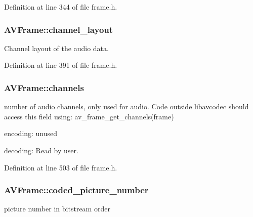 Definition at line 344 of file frame.\+h.

\subsubsection[{\texorpdfstring{channel\+\_\+layout}{channel_layout}}]{ A\+V\+Frame\+::channel\+\_\+layout}\hypertarget{struct_a_v_frame_a5f343e0325e3e9d9ed20e34c9e156aef}{}\label{struct_a_v_frame_a5f343e0325e3e9d9ed20e34c9e156aef}
Channel layout of the audio data. 

Definition at line 391 of file frame.\+h.

\subsubsection[{\texorpdfstring{channels}{channels}}]{ A\+V\+Frame\+::channels}\hypertarget{struct_a_v_frame_a58c663568a99c1477c163e64858b3fef}{}\label{struct_a_v_frame_a58c663568a99c1477c163e64858b3fef}
number of audio channels, only used for audio. Code outside libavcodec should access this field using\+: av\+\_\+frame\+\_\+get\+\_\+channels(frame)
\begin{DoxyItemize}
\item encoding\+: unused
\item decoding\+: Read by user. 
\end{DoxyItemize}

Definition at line 503 of file frame.\+h.

\subsubsection[{\texorpdfstring{coded\+\_\+picture\+\_\+number}{coded_picture_number}}]{ A\+V\+Frame\+::coded\+\_\+picture\+\_\+number}\hypertarget{struct_a_v_frame_a02ca9bb7f500d3d850f8736f3cb29c6c}{}\label{struct_a_v_frame_a02ca9bb7f500d3d850f8736f3cb29c6c}
picture number in bitstream order 

